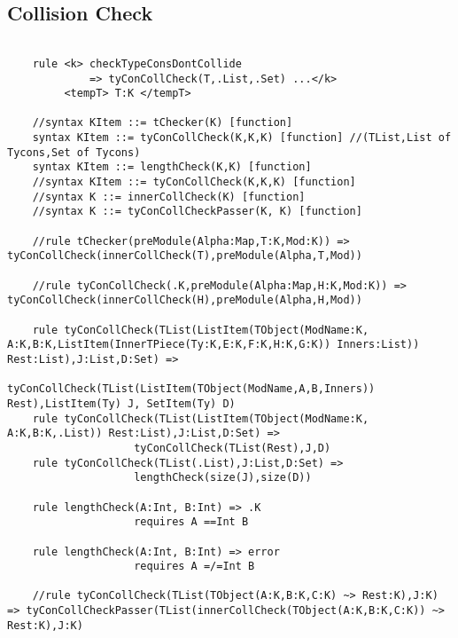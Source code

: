 \subsection{Collision Check}
\begin{lstlisting}

    rule <k> checkTypeConsDontCollide
             => tyConCollCheck(T,.List,.Set) ...</k>
         <tempT> T:K </tempT>

    //syntax KItem ::= tChecker(K) [function]
    syntax KItem ::= tyConCollCheck(K,K,K) [function] //(TList,List of Tycons,Set of Tycons) 
    syntax KItem ::= lengthCheck(K,K) [function]
    //syntax KItem ::= tyConCollCheck(K,K,K) [function]
    //syntax K ::= innerCollCheck(K) [function]
    //syntax K ::= tyConCollCheckPasser(K, K) [function]

    //rule tChecker(preModule(Alpha:Map,T:K,Mod:K)) => tyConCollCheck(innerCollCheck(T),preModule(Alpha,T,Mod))

    //rule tyConCollCheck(.K,preModule(Alpha:Map,H:K,Mod:K)) => tyConCollCheck(innerCollCheck(H),preModule(Alpha,H,Mod))

    rule tyConCollCheck(TList(ListItem(TObject(ModName:K, A:K,B:K,ListItem(InnerTPiece(Ty:K,E:K,F:K,H:K,G:K)) Inners:List)) Rest:List),J:List,D:Set) => 
                    tyConCollCheck(TList(ListItem(TObject(ModName,A,B,Inners)) Rest),ListItem(Ty) J, SetItem(Ty) D)
    rule tyConCollCheck(TList(ListItem(TObject(ModName:K, A:K,B:K,.List)) Rest:List),J:List,D:Set) => 
                    tyConCollCheck(TList(Rest),J,D)
    rule tyConCollCheck(TList(.List),J:List,D:Set) => 
                    lengthCheck(size(J),size(D))

    rule lengthCheck(A:Int, B:Int) => .K
                    requires A ==Int B

    rule lengthCheck(A:Int, B:Int) => error
                    requires A =/=Int B

    //rule tyConCollCheck(TList(TObject(A:K,B:K,C:K) ~> Rest:K),J:K) => tyConCollCheckPasser(TList(innerCollCheck(TObject(A:K,B:K,C:K)) ~> Rest:K),J:K)
\end{lstlisting}

